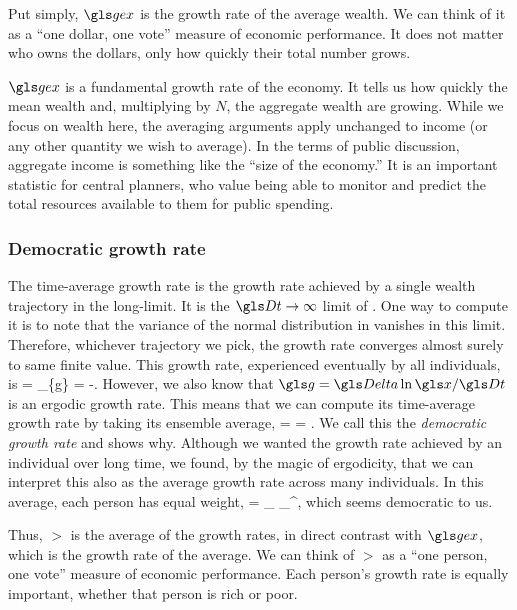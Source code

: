 Put simply, $\gex$ is the growth rate of the average wealth. We can think of it as a ``one dollar, one vote'' measure of economic performance. It does not matter who owns the dollars, only how quickly their total number grows.

$\gex$ is a fundamental growth rate of the economy. It tells us how quickly the mean wealth and, multiplying by $N$, the aggregate wealth are growing. While we focus on wealth here, the averaging arguments apply unchanged to income (or any other quantity we wish to average). In the terms of public discussion, aggregate income is something like the ``size of the economy.'' It is an important statistic for central planners, who value being able to monitor and predict the total resources available to them for public spending.

\subsubsection{Democratic growth rate}
The time-average growth rate is the growth rate achieved by a single wealth trajectory in the long-limit. It is the $\Dt\to\infty$ limit of . One way to compute it is to note that the variance of the normal distribution in  vanishes in this limit. Therefore, whichever trajectory we pick, the growth rate converges almost surely to same finite value. This growth rate, experienced eventually by all individuals, is
\be
\gt = \lim_{\Dt\to\infty}\left\{g\right\} = \gmu-.
\ee
However, we also know that $\g=\D\ln\x/\Dt$ is an ergodic growth rate. This means that we can compute its time-average growth rate by taking its ensemble average, 
\be
\gt = \ave{\g} = \ave{\frac{\D\ln \x}{\Dt}}.
\ee
We call this the \textit{democratic growth rate} and  shows why. Although we wanted the growth rate achieved by an individual over long time, we found, by the magic of  ergodicity, that we can interpret this also as the average growth rate across many individuals. In this average, each person has equal weight,
\be
\gt = \lim_{\N\to\infty} \sum_{}^\N \frac{\g_\gi}{\N},
\ee
which seems democratic to us.

Thus, $\gt$ is the average of the growth rates, in direct contrast with $\gex$, which is the growth rate of the average. We can think of $\gt$ as a ``one person, one vote'' measure of economic performance. Each person's growth rate is equally important, whether that person is rich or poor.

